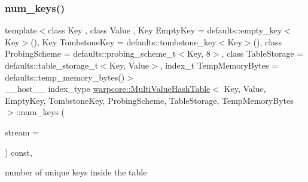 \subsubsection{\texorpdfstring{num\+\_\+keys()}{num\_keys()}}
{\footnotesize\ttfamily template$<$class Key , class Value , Key Empty\+Key = defaults\+::empty\+\_\+key$<$\+Key$>$(), Key Tombstone\+Key = defaults\+::tombstone\+\_\+key$<$\+Key$>$(), class Probing\+Scheme  = defaults\+::probing\+\_\+scheme\+\_\+t$<$\+Key, 8$>$, class Table\+Storage  = defaults\+::table\+\_\+storage\+\_\+t$<$\+Key, Value$>$, index\+\_\+t Temp\+Memory\+Bytes = defaults\+::temp\+\_\+memory\+\_\+bytes()$>$ \\
\+\_\+\+\_\+host\+\_\+\+\_\+ index\+\_\+type \hyperlink{classwarpcore_1_1MultiValueHashTable}{warpcore\+::\+Multi\+Value\+Hash\+Table}$<$ Key, Value, Empty\+Key, Tombstone\+Key, Probing\+Scheme, Table\+Storage, Temp\+Memory\+Bytes $>$\+::num\+\_\+keys (\begin{DoxyParamCaption}\item[{const cuda\+Stream\+\_\+t}]{stream = {} }\end{DoxyParamCaption}) const\hspace{0.3cm}{\ttfamily [inline]}, {\ttfamily [noexcept]}}



number of unique keys inside the table 


